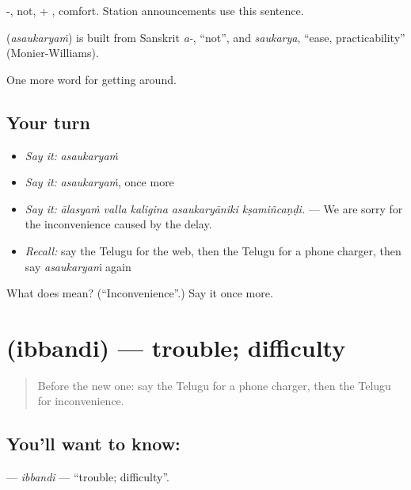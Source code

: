 -, not, + , comfort. Station announcements use this sentence.

\begin{cousinweb}
\textbf{} (\emph{asaukaryaṁ}) is built from Sanskrit \emph{a-}, \textquotedblleft{}not\textquotedblright{}, and \emph{saukarya}, \textquotedblleft{}ease, practicability\textquotedblright{} (Monier-Williams).
\end{cousinweb}

\begin{grammarlens}[title={What you've built}]
One more word for getting around.
\end{grammarlens}

\subsection*{Your turn}
\begin{itemize}
\raggedright
  \item \emph{Say it:} \emph{asaukaryaṁ}
  \item \emph{Say it:} \emph{asaukaryaṁ}, once more
  \item \emph{Say it:} \emph{ālasyaṁ valla kaligina asaukaryāniki kṣamiñcaṇḍi.} — We are sorry for the inconvenience caused by the delay.
  \item \emph{Recall:} say the Telugu for the web, then the Telugu for a phone charger, then say \emph{asaukaryaṁ} again
\end{itemize}

\begin{tcolorbox}[breakable,colback=teal!4,colframe=teal!35!black,title={Before you move on}]
What does  mean? (\textquotedblleft{}Inconvenience\textquotedblright{}.) Say it once more.
\end{tcolorbox}
\section[\texorpdfstring{\te{ఇబ్బంది} (ibbandi)}{ఇబ్బంది (ibbandi)}]{ (ibbandi) — trouble; difficulty}

\label{lesson:TE-C460-ibbandi}



\begin{quote}
Before the new one: say the Telugu for a phone charger, then the Telugu for inconvenience.
\end{quote}

\subsection*{You'll want to know: }
\textbf{} — \emph{ibbandi} — \textquotedblleft{}trouble; difficulty\textquotedblright{}.

